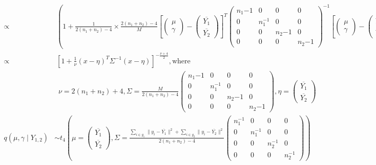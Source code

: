 \documentclass{article}
\begin{document}
\begin{align*}
  \propto&\; \left(1 + \frac{1}{2(n_1 + n_2) - 4}\times\frac{2(n_1 + n_2) - 4}{M}\left[\left(\begin{matrix}\mu\\ \gamma\end{matrix}\right) - \left(\begin{matrix*}\overline{Y_1}\\ \overline{Y_2}\end{matrix*}\right)\right]^T \left(\begin{matrix*} n_1{-1} & 0 & 0 & 0 \\ 0 & n_1^{-1} & 0 & 0 \\ 0 & 0 & n_2{-1} & 0 \\ 0 & 0 & 0 & n_2{-1} \end{matrix*}\right)^{-1} \left[\left(\begin{matrix}\mu\\ \gamma\end{matrix}\right) - \left(\begin{matrix*}\overline{Y_1}\\ \overline{Y_2}\end{matrix*}\right)\right]\right)^{-(n_1 + n_2)}\\
  \propto&\; \left[1 + \frac{1}{\nu}(x - \eta)^T\Sigma^{-1}(x - \eta)\right]^{-\frac{\nu + 4}{2}}, \textrm{where }\\
  &\;\; \nu=2(n_1 + n_2) + 4, \Sigma=\frac{M}{2(n_1 + n_2) - 4}\left(\begin{matrix*} n_1{-1} & 0 & 0 & 0 \\ 0 & n_1^{-1} & 0 & 0 \\ 0 & 0 & n_2{-1} & 0 \\ 0 & 0 & 0 & n_2{-1} \end{matrix*}\right), \eta=\left(\begin{matrix*}\overline{Y_1}\\ \overline{Y_2}\end{matrix*}\right)\\
  q(\mu, \gamma \mid Y_{1,2}) &\sim t_4\left(\mu= \left(\begin{matrix*}
    \overline{Y_1}\\ \overline{Y_2} \end{matrix*}\right), \Sigma=\frac{\sum_{i\in g_1}\lVert y_i - \overline{Y_1} \rVert^2 + \sum_{i \in g_2}\lVert y_i - \overline{Y_2}\rVert^2}{2(n_1 + n_2) - 4}\left(\begin{matrix*}
      n_1^{-1} & 0 & 0 & 0 \\ 0 & n_1^{-1} & 0 & 0 \\ 0 & 0 & n_2^{-1} & 0 \\ 0 & 0 & 0 & n_2^{-1}
    \end{matrix*}\right)\right)
\end{align*}
\end{document}

